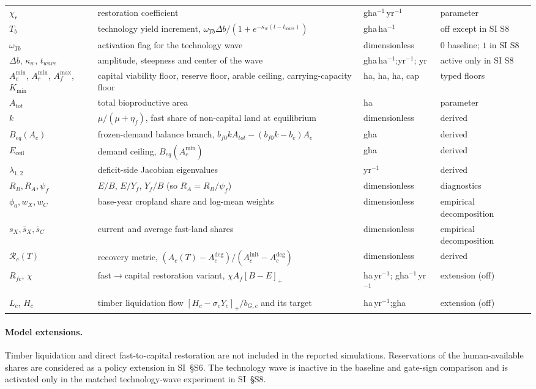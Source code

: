 \documentclass[11pt,a4paper]{article}
\newcommand{\pos}[1]{\left[#1\right]_+}
\newcommand{\Eceil}{E_{\mathrm{ceil}}}
\newcommand{\Acmin}{A_c^{\min}}
\begin{document}
\begin{longtable}{>{\raggedright\arraybackslash}p{}>{\raggedright\arraybackslash}p{}>{\raggedright\arraybackslash}p{}>{\raggedright\arraybackslash}p{}}
$\chi_r$ & restoration coefficient & gha$^{-1}$\,yr$^{-1}$ & parameter \\
$T_b$ & technology yield increment, $\omega_{Tb}\Delta b/(1+e^{-\kappa_w(t-t_{wave})})$ & gha\,ha$^{-1}$ & off except in SI S8 \\
$\omega_{Tb}$ & activation flag for the technology wave & dimensionless & $0$ baseline; $1$ in SI S8 \\
$\Delta b$, $\kappa_w$, $t_{wave}$ & amplitude, steepness and center of the wave & gha\,ha$^{-1}$;\newline yr$^{-1}$; yr & active only in SI S8 \\
$\Acmin$, $A_r^{\min}$, $A_f^{\max}$, $K_{\min}$ & capital viability floor, reserve floor, arable ceiling, carrying-capacity floor & ha, ha, ha, cap & typed floors \\
$A_{tot}$ & total bioproductive area & ha & parameter \\
$k$ & $\mu/(\mu+\eta_f)$, fast share of non-capital land at equilibrium & dimensionless & derived \\
$B_{eq}(A_c)$ & frozen-demand balance branch, $b_{f0}kA_{tot}-(b_{f0}k-b_c)A_c$ & gha & derived \\
$\Eceil$ & demand ceiling, $B_{eq}(\Acmin)$ & gha & derived \\
$\lambda_{1,2}$ & deficit-side Jacobian eigenvalues & yr$^{-1}$ & derived \\
$R_B,R_A,\psi_f$ & $E/B$, $E/Y_f$, $Y_f/B$ (so $R_A=R_B/\psi_f$) & dimensionless & diagnostics \\
$\phi_0,w_X,w_C$ & base-year cropland share and log-mean weights & dimensionless & empirical decomposition \\
$s_X,\bar s_X,\bar s_C$ & current and average fast-land shares & dimensionless & empirical decomposition \\
$\mathcal R_c(T)$ & recovery metric, $(A_c(T)-A_c^{\mathrm{deg}})/(A_c^{\mathrm{init}}-A_c^{\mathrm{deg}})$ & dimensionless & derived \\
$R_{fc}$, $\chi$ & fast$\to$capital restoration variant, $\chi A_f\pos{B-E}$ & ha\,yr$^{-1}$; gha$^{-1}$\,yr$^{-1}$ & extension (off) \\
$L_c$, $H_c$ & timber liquidation flow $\pos{H_c-\sigma_cY_c}/b_{G,c}$ and its target & ha\,yr$^{-1}$;\newline gha & extension (off) \\
\bottomrule
\end{longtable}

\paragraph{Model extensions.} Timber liquidation and direct fast-to-capital restoration are not included in the reported simulations. Reservations of the human-available shares are considered as a policy extension in SI~\S S6. The technology wave is inactive in the baseline and gate-sign comparison and is activated only in the matched technology-wave experiment in SI~\S S8.
\end{document}
